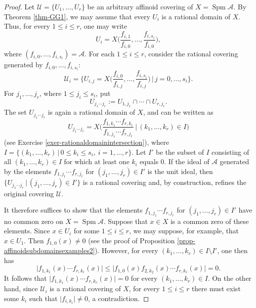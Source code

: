 \documentclass[a4paper,12pt, dvipdfmx]{jsbook}
\def\Spm{\mathop{\mathrm{Spm}}\nolimits}
\newcommand{\abs}[1]{\lvert#1\rvert}
\theoremstyle{plain}
\theoremstyle{definition}
\begin{document}
\begin{proof}[Proof]
Let $\mathcal{U}=\{U_1,\ldots,U_r\}$ be an arbitrary affinoid covering of $X=\Spm\mathcal{A}$.
By Theorem \ref{thm-GG1}, we may assume that every $U_i$ is a rational domain of $X$.
Thus, for every $1\leq i\leq r$, one may write
$$
U_i=X\big({\textstyle \frac{f_{i,1}}{f_{i,0}},\ldots,\frac{f_{i,s_i}}{f_{i,0}}}\big),
$$
where $(f_{i,0},\ldots,f_{i,s_i})=\mathcal{A}$.
For each $1\leq i\leq r$, consider the rational covering generated by $f_{i,0},\ldots,f_{i,s_i}$:
$$
\mathcal{U}_i=\{U_{i,j}=X\big({\textstyle \frac{f_{i,0}}{f_{i,j}},\ldots,\frac{f_{i,s_i}}{f_{i,j}}}\big)\,|\,j=0,\ldots,s_i\}.
$$
For $j_1,\ldots,j_r$, where $1\leq j_i\leq s_i$, put
$$
U_{j_1\cdots j_r}:=U_{1,j_1}\cap\cdots\cap U_{r,j_r}.
$$
The set $U_{j_1\cdots j_r}$ is again a rational domain of $X$, and can be written as
$$
U_{j_1\cdots j_r}=X\big({\textstyle \frac{f_{1,k_1}\cdots f_{r,k_r}}{f_{1,j_1}\cdots f_{r,j_r}}}\,\big|\,(k_1,\ldots,k_r)\in I\big)
$$
(see Exercise \ref{exer-rationaldomainintersection}), where $I=\{(k_1,\ldots,k_r)\,|\,0\leq k_i\leq s_i,\ i=1,\ldots,r\}$.
Let $I'$ be the subset of $I$ consisting of all $(k_1,\ldots,k_r)\in I$ for which at least one $k_i$ equals $0$.
If the ideal of $\mathcal{A}$ generated by the elements $f_{1,j_1}\cdots f_{r,j_r}$ for $(j_1,\ldots,j_r)\in I'$ is the unit ideal, then $\{U_{j_1\cdots j_r}\,|\,(j_1,\ldots,j_r)\in I'\}$ is a rational covering and, by construction, refines the original covering $\mathcal{U}$.

It therefore suffices to show that the elements $f_{1,j_1}\cdots f_{r,j_r}$ for $(j_1,\ldots,j_r)\in I'$ have no common zero on $X=\Spm\mathcal{A}$.
Suppose that $x\in X$ is a common zero of these elements.
Since $x\in U_i$ for some $1\leq i\leq r$, we may suppose, for example, that $x\in U_1$.
Then $f_{1,0}(x)\neq 0$ (see the proof of Proposition \ref{prop-affinoidsubdomainsexamples2}).
However, for every $(k_1,\ldots,k_r)\in I\setminus I'$, one then has
$$
\abs{f_{1,k_1}(x)\cdots f_{r,k_r}(x)}\leq\abs{f_{1,0}(x)f_{2,k_2}(x)\cdots f_{r,k_r}(x)}=0.
$$
It follows that $\abs{f_{1,k_1}(x)\cdots f_{r,k_r}(x)}=0$ for every $(k_1,\ldots,k_r)\in I$.
On the other hand, since $\mathcal{U}_i$ is a rational covering of $X$, for every $1\leq i\leq r$ there must exist some $k_i$ such that $\abs{f_{i,k_i}}\neq 0$, a contradiction.
\end{proof}
\end{document}

